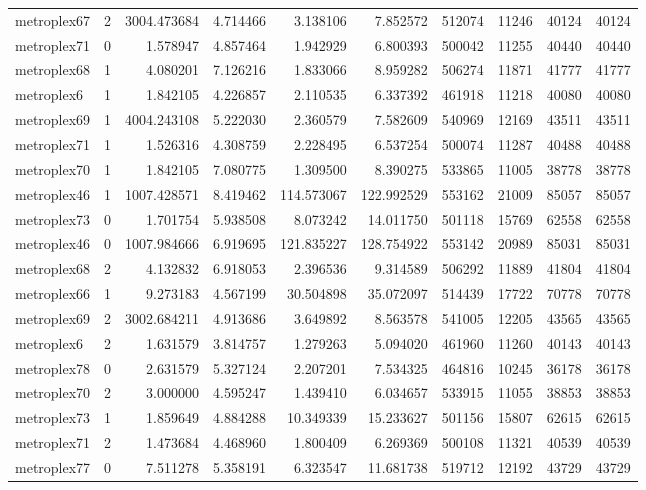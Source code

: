 \begin{longtable}{|l|r|r|r|r|r|r|r|r|r|}
metroplex67 & 2 & 3004.473684 & 4.714466 & 3.138106 & 7.852572 & 512074 & 11246 & 40124 & 40124 \\
metroplex71 & 0 & 1.578947 & 4.857464 & 1.942929 & 6.800393 & 500042 & 11255 & 40440 & 40440 \\
metroplex68 & 1 & 4.080201 & 7.126216 & 1.833066 & 8.959282 & 506274 & 11871 & 41777 & 41777 \\
metroplex6 & 1 & 1.842105 & 4.226857 & 2.110535 & 6.337392 & 461918 & 11218 & 40080 & 40080 \\
metroplex69 & 1 & 4004.243108 & 5.222030 & 2.360579 & 7.582609 & 540969 & 12169 & 43511 & 43511 \\
metroplex71 & 1 & 1.526316 & 4.308759 & 2.228495 & 6.537254 & 500074 & 11287 & 40488 & 40488 \\
metroplex70 & 1 & 1.842105 & 7.080775 & 1.309500 & 8.390275 & 533865 & 11005 & 38778 & 38778 \\
metroplex46 & 1 & 1007.428571 & 8.419462 & 114.573067 & 122.992529 & 553162 & 21009 & 85057 & 85057 \\
metroplex73 & 0 & 1.701754 & 5.938508 & 8.073242 & 14.011750 & 501118 & 15769 & 62558 & 62558 \\
metroplex46 & 0 & 1007.984666 & 6.919695 & 121.835227 & 128.754922 & 553142 & 20989 & 85031 & 85031 \\
metroplex68 & 2 & 4.132832 & 6.918053 & 2.396536 & 9.314589 & 506292 & 11889 & 41804 & 41804 \\
metroplex66 & 1 & 9.273183 & 4.567199 & 30.504898 & 35.072097 & 514439 & 17722 & 70778 & 70778 \\
metroplex69 & 2 & 3002.684211 & 4.913686 & 3.649892 & 8.563578 & 541005 & 12205 & 43565 & 43565 \\
metroplex6 & 2 & 1.631579 & 3.814757 & 1.279263 & 5.094020 & 461960 & 11260 & 40143 & 40143 \\
metroplex78 & 0 & 2.631579 & 5.327124 & 2.207201 & 7.534325 & 464816 & 10245 & 36178 & 36178 \\
metroplex70 & 2 & 3.000000 & 4.595247 & 1.439410 & 6.034657 & 533915 & 11055 & 38853 & 38853 \\
metroplex73 & 1 & 1.859649 & 4.884288 & 10.349339 & 15.233627 & 501156 & 15807 & 62615 & 62615 \\
metroplex71 & 2 & 1.473684 & 4.468960 & 1.800409 & 6.269369 & 500108 & 11321 & 40539 & 40539 \\
metroplex77 & 0 & 7.511278 & 5.358191 & 6.323547 & 11.681738 & 519712 & 12192 & 43729 & 43729 \\

\end{longtable}
